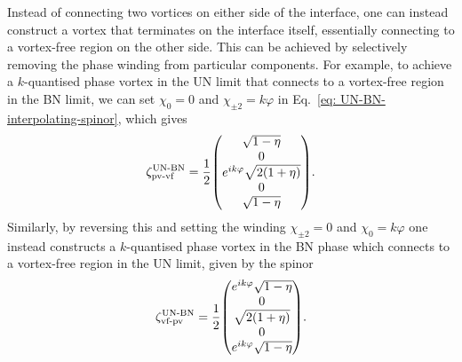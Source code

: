 Instead of connecting two vortices on either side of the interface, one can
instead construct a vortex that terminates on the interface itself, essentially
connecting to a vortex-free region on the other side.
This can be achieved by selectively removing the phase winding from particular
components.
For example, to achieve a \(k\)-quantised phase vortex in the UN limit that
connects to a vortex-free region in the BN limit, we can set \(\chi_0 = 0\) and
\(\chi_{\pm 2} = k\varphi \) in Eq.~\eqref{eq: UN-BN-interpolating-spinor},
which gives
\begin{align}\label{eq: UN-BN-pv-vf}
    \zeta^\text{UN-BN}_\text{pv-vf} = \frac{1}{2}\mqty(
        \sqrt{1-\eta} \\
        0 \\
        e^{ik\varphi} \sqrt{2(1+\eta)} \\
        0 \\
        \sqrt{1-\eta}
    ).
\end{align}
Similarly, by reversing this and setting the winding \(\chi_{\pm 2} = 0\) and
\(\chi_0=k\varphi \) one instead constructs a \(k\)-quantised phase vortex in
the BN phase which connects to a vortex-free region in the UN limit, given by
the spinor
\begin{align}\label{eq: UN-BN-vf-pv}
    \zeta^\text{UN-BN}_\text{vf-pv} = \frac{1}{2}\mqty(
        e^{ik\varphi} \sqrt{1-\eta} \\
        0 \\
        \sqrt{2(1+\eta)} \\
        0 \\
        e^{ik\varphi} \sqrt{1-\eta}
    ).
\end{align}

